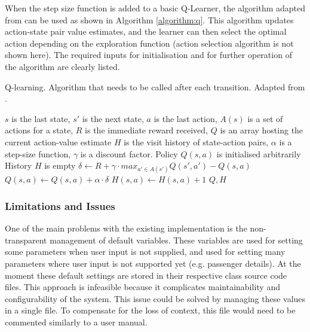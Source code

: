 When the step size function is added to a basic Q-Learner, the algorithm
adapted from \textcite{Sutton1998ai+reinforcement} can be used as shown in
Algorithm \ref{algorithm:q}. This algorithm updates action-state pair value
estimates, and the learner can then select the optimal action depending on the
exploration function (action selection algorithm is not shown here). The
required inputs for initialisation and for further operation of the algorithm
are clearly listed.

\begin{algorithm}
  \caption{
  Q-learning. Algorithm that needs to be called after each transition. 
  Adapted from \textcite{Sutton1998ai+reinforcement}. 
  \label{algorithm:q}}

  \begin{algorithmic}[1]
    \Require
      \Statex $s$ is the last state,
      \Statex $s'$ is the next state,
      \Statex $a$ is the last action,
      \Statex $A(s)$ is a set of actions for a state,
      \Statex $R$ is the immediate reward received,
      \Statex $Q$ is an array hosting the current action-value estimate
      \Statex $H$ is the visit history of state-action pairs,
      \Statex $\alpha$ is a step-size function,
      \Statex $\gamma$ is a discount factor.
      \Statex Policy $Q(s, a)$ is initialised arbitrarily
      \Statex History $H$ is empty
      \State $\delta \gets R + 
              \gamma \cdot max_{a' \in A(s')} Q(s', a') - Q(s, a)$
      \State $Q(s, a) \gets Q(s, a) + \alpha \cdot \delta$
      \State $H(s, a) \gets H(s, a) + 1$
      \State \Return $Q, H$
    \EndFunction
  \end{algorithmic}
\end{algorithm}


\subsubsection{Limitations and Issues}
\label{sec:implementation:software:issues}

One of the main problems with the existing implementation is the non-
transparent management of default variables. These variables are used for
setting some parameters when user input is not supplied, and used for setting
many parameters where user input is not supported yet (e.g. passenger details).
At the moment these default settings are stored in their respective class
source code files. This approach is infeasible because it complicates
maintainability and configurability of the system. This issue could be solved
by managing these values in a single file. To compensate for the loss of
context, this file would need to be commented similarly to a user manual.

